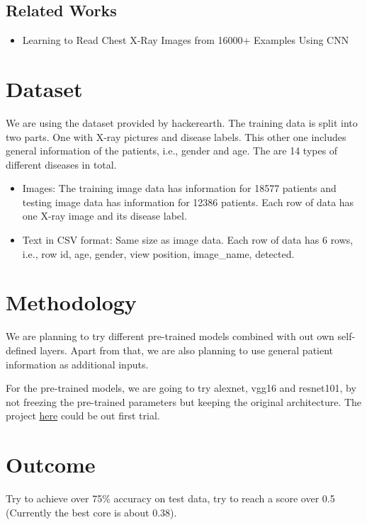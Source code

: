 \documentclass[10pt,twocolumn,letterpaper]{article}
\begin{document}
    \subsection{Related Works}
        \begin{itemize}
            \item Learning to Read Chest X-Ray Images from 16000+ Examples Using CNN \cite{dong2017learning}
        \end{itemize}

\section{Dataset}
We are using the dataset provided by hackerearth. The training data is split into two parts. One with X-ray pictures and disease labels. This other one includes general information of the patients, i.e., gender and age. The are 14 types of different diseases in total.

\begin{itemize}
	\item Images:  The training image data has information for 18577 patients and testing image data has information for 12386 patients. Each row of data has one X-ray image and its disease label.
	\item Text in CSV format: Same size as image data. Each row of data has 6 rows, i.e., row id, age, gender, view position, image\_name, detected.
\end{itemize}

\section{Methodology}
We are planning to try different pre-trained models combined with out own self-defined layers. Apart from that, we are also planning to use general patient information as additional inputs.

For the pre-trained models, we are going to try alexnet, vgg16 and resnet101, by not freezing the pre-trained parameters but keeping the original architecture. The project \href{https://github.com/ayush1997/Xvision}{here} could be out first trial.

\section{Outcome}
    Try to achieve over 75\% accuracy on test data, try to reach a score over 0.5 (Currently the best core is about 0.38).

{\small


}
\end{document}
